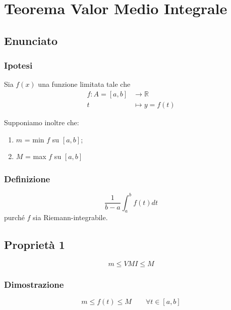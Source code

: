 \documentclass[../dimostrazioni]{subfiles}
\begin{document}
    \chapter{Teorema Valor Medio Integrale}
    \label{teoValorMedioIntegrale}

    \section*{Enunciato}

        \subsection*{Ipotesi}

            Sia \(f(x)\) una funzione limitata tale che
            \begin{align*}
                f : A = [a, b] &\longrightarrow \mathbb{R}\\
                t &\longmapsto y = f(t) 
            \end{align*}

            Supponiamo inoltre che:

                \begin{enumerate}
                    \indentitem \item \(m\) = min \(f\) su \([a, b]\);
                    \indentitem \item \(M\) = max \(f\) su \([a, b]\)
                \end{enumerate}  

        \subsection*{Definizione}

            \[ \frac{1}{b-a} \int_{a}^{b} f(t)dt \]
            purché \(f\) sia Riemann-integrabile.

    \section*{Proprietà 1}

        \[ m \leqslant VMI \leqslant M \]

        \subsection*{Dimostrazione}
    
            \[m \leqslant f(t) \leqslant M  \qquad \forall t \in [a, b] \]
\end{document}
